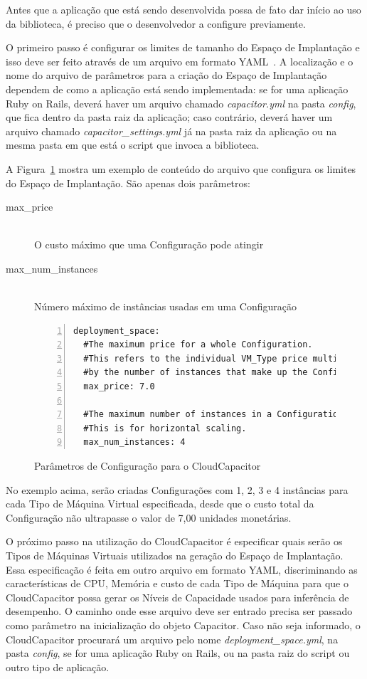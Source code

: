 Antes que a aplicação que está sendo desenvolvida possa de fato dar início ao uso 
da biblioteca, é preciso que o desenvolvedor a configure previamente. 

O primeiro passo é configurar os limites de tamanho do Espaço de Implantação e 
isso deve ser feito através de um arquivo em formato YAML~\cite{yml}. A localização 
e o nome do arquivo de parâmetros para a criação do Espaço de Implantação dependem 
de como a aplicação está sendo implementada: se for uma aplicação Ruby on Rails, 
deverá haver um arquivo chamado \emph{capacitor.yml} na pasta \emph{config}, que 
fica dentro da pasta raiz da aplicação; caso contrário, deverá haver um arquivo 
chamado \emph{capacitor\_settings.yml} já na pasta raiz da aplicação ou na mesma 
pasta em que está o script que invoca a biblioteca. 

A Figura~\ref{fig:settings} mostra um exemplo de conteúdo do arquivo que configura
os limites do Espaço de Implantação. São apenas dois parâmetros:

\begin{description}
  \item[max\_price] \hfill \\ O custo máximo que uma Configuração pode atingir
  \item[max\_num\_instances] \hfill \\ Número máximo de instâncias usadas em uma Configuração 
\end{description}

\begin{figure}[h]
  \caption{\label{fig:settings}Parâmetros de Configuração para o CloudCapacitor}
 \begin{lstlisting}[linewidth=\textwidth,xleftmargin=.04\textwidth, numbers=left]
deployment_space:
  #The maximum price for a whole Configuration.
  #This refers to the individual VM_Type price multiplied 
  #by the number of instances that make up the Configuration
  max_price: 7.0

  #The maximum number of instances in a Configuration. 
  #This is for horizontal scaling.
  max_num_instances: 4
  \end{lstlisting}
\end{figure}

No exemplo acima, serão criadas Configurações com 1, 2, 3 e 4 instâncias para cada
Tipo de Máquina Virtual especificada, desde que o custo total da Configuração não
ultrapasse o valor de 7,00 unidades monetárias.

O próximo passo na utilização do CloudCapacitor é especificar quais serão os Tipos
de Máquinas Virtuais utilizados na geração do Espaço de Implantação. Essa 
especificação é feita em outro arquivo em formato YAML, discriminando as 
características de CPU, Memória e custo de cada Tipo de Máquina para que o
CloudCapacitor possa gerar os Níveis de Capacidade usados para inferência de
desempenho. O caminho onde esse arquivo deve ser entrado precisa ser passado 
como parâmetro na inicialização do objeto Capacitor. Caso não seja informado, o 
CloudCapacitor procurará um arquivo pelo nome \emph{deployment\_space.yml}, na
pasta \emph{config}, se for uma aplicação Ruby on Rails, ou na pasta raiz do
script ou outro tipo de aplicação.
 
